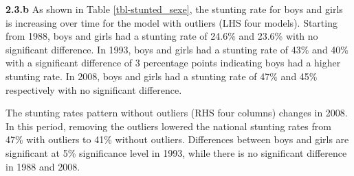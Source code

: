 \documentclass[
  letterpaper,
  DIV=11,
  numbers=noendperiod]{scrartcl}
\begin{document}
\textbf{2.3.b} As shown in Table \ref{tbl-stunted_sexe}, the stunting
rate for boys and girls is increasing over time for the model with
outliers (LHS four models). Starting from 1988, boys and girls had a
stunting rate of 24.6\% and 23.6\% with no significant difference. In
1993, boys and girls had a stunting rate of 43\% and 40\% with a
significant difference of 3 percentage points indicating boys had a
higher stunting rate. In 2008, boys and girls had a stunting rate of
47\% and 45\% respectively with no significant difference.

The stunting rates pattern without outliers (RHS four columns) changes
in 2008. In this period, removing the outliers lowered the national
stunting rates from 47\% with outliers to 41\% without outliers.
Differences between boys and girls are significant at 5\% significance
level in 1993, while there is no significant difference in 1988 and
2008.
\end{document}

